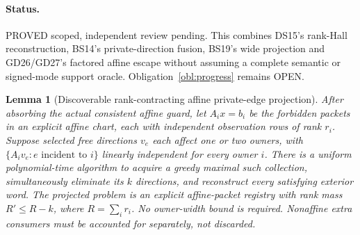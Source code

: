 \documentclass[11pt]{article}
\newtheorem{lemma}[theorem]{Lemma}
\begin{document}
\paragraph{Status.} PROVED scoped, independent review pending. This combines DS15's rank-Hall reconstruction, BS14's private-direction fusion, BS19's wide projection and GD26/GD27's factored affine escape without assuming a complete semantic or signed-mode support oracle. Obligation~\ref{obl:progress} remains OPEN.
\begin{lemma}[Discoverable rank-contracting affine private-edge projection]\label{lem:ds20-private}
After absorbing the actual consistent affine guard, let $A_ix=b_i$ be the forbidden packets in an explicit affine chart, each with independent observation rows of rank $r_i$. Suppose selected free directions $v_e$ each affect one or two owners, with $\{A_iv_e:e\text{ incident to }i\}$ linearly independent for every owner $i$. There is a uniform polynomial-time algorithm to acquire a greedy maximal such collection, simultaneously eliminate its $k$ directions, and reconstruct every satisfying exterior word. The projected problem is an explicit affine-packet registry with rank mass $R'\le R-k$, where $R=\sum_i r_i$. No owner-width bound is required. Nonaffine extra consumers must be accounted for separately, not discarded.
\end{lemma}
\end{document}
